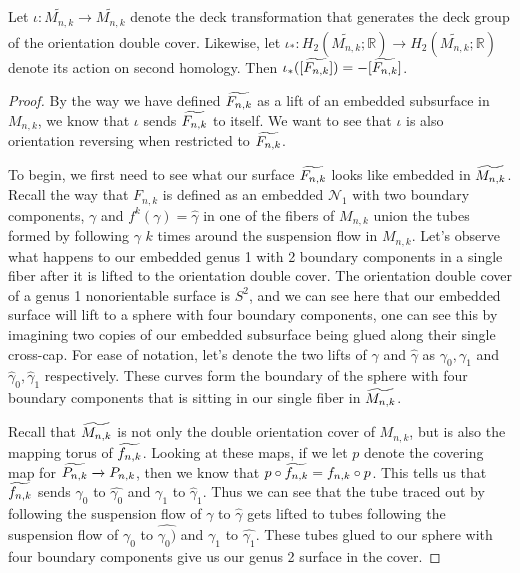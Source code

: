 \begin{lem}
Let $\iota: \widetilde{M_{n,k}} \xrightarrow[]{} \widetilde{M_{n,k}}$ denote the deck transformation that generates the deck group of the orientation double cover. Likewise, let $\iota_*: H_2(\widetilde{M_{n,k}};\mathbb{R}) \xrightarrow[]{} H_2(\widetilde{M_{n,k}};\mathbb{R})$ denote its action on second homology. Then $\iota_*([\widetilde{F_{n,k}}]) = -[\widetilde{F_{n,k}}]$.
\end{lem}
\begin{proof}

By the way we have defined $\widetilde{F_{n,k}}$ as a lift of an embedded subsurface in $M_{n,k}$, we know that $\iota$ sends $\widetilde{F_{n,k}}$ to itself. We want to see that $\iota$ is also orientation reversing when restricted to $\widetilde{F_{n,k}}$.

To begin, we first need to see what our surface $\widetilde{F_{n,k}}$ looks like embedded in $\widetilde{M_{n,k}}$. Recall the way that $F_{n,k}$ is defined as an embedded $\mathcal{N}_1$ with two boundary components, $\gamma$ and $f^k(\gamma) = \hat{\gamma}$ in one of the fibers of $M_{n,k}$ union the tubes formed by following $\gamma$ $k$ times around the suspension flow in $M_{n,k}$. Let's observe what happens to our embedded genus 1 with 2 boundary components in a single fiber after it is lifted to the orientation double cover. The orientation double cover of a genus 1 nonorientable surface is $S^2$, and we can see here that our embedded surface will lift to a sphere with four boundary components, one can see this by imagining two copies of our embedded subsurface being glued along their single cross-cap. For ease of notation, let's denote the two lifts of $\gamma$ and $\hat{\gamma}$ as $\gamma_0,\gamma_1$ and $\hat{\gamma}_0,\hat{\gamma}_1$ respectively. These curves form the boundary of the sphere with four boundary components that is sitting in our single fiber in $\widetilde{M_{n,k}}$. 

Recall that $\widetilde{M_{n,k}}$ is not only the double orientation cover of $M_{n,k}$, but is also the mapping torus of $\widetilde{f_{n,k}}$. Looking at these maps, if we let $p$ denote the covering map for $\widetilde{P_{n,k}} \xrightarrow[]{} P_{n,k}$, then we know that $p \circ \widetilde{f_{n,k}} = f_{n,k} \circ p$. This tells us that $\widetilde{f_{n,k}}$ sends $\gamma_0$ to $\hat{\gamma_0}$ and $\gamma_1$ to $\hat{\gamma}_1$. Thus we can see that the tube traced out by following the suspension flow of $\gamma$ to $\hat{\gamma}$ gets lifted to tubes following the suspension flow of $\gamma_0$ to $\hat{\gamma_0)}$ and $\gamma_1$ to $\hat{\gamma_1}$. These tubes glued to our sphere with four boundary components give us our genus 2 surface in the cover. 


\end{proof}
